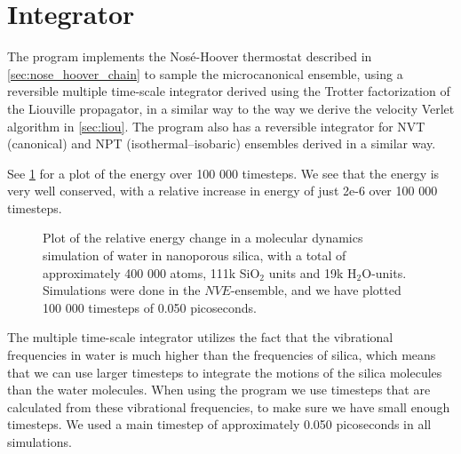 \section{Integrator\label{sec:sio2_integrator}}
%
The program implements the Nos\'e-Hoover thermostat described in \cref{sec:nose_hoover_chain} to sample the microcanonical ensemble, using a reversible multiple time-scale integrator derived using the Trotter factorization of the Liouville propagator\cite{tuckerman1992reversible}, in a similar way to the way we derive the velocity Verlet algorithm in \cref{sec:liou}. The program also has a reversible integrator for NVT (canonical) and NPT (isothermal–isobaric) ensembles\cite{martyna1996explicit} derived in a similar way. 

See \cref{fig:energy_conservation_plot} for a plot of the energy over 100 000 timesteps. We see that the energy is very well conserved, with a relative increase in energy of just 2e-6 over 100 000 timesteps.
%
\begin{figure}[!htb]%
    \centering%
    \caption{%
        Plot of the relative energy change in a molecular dynamics simulation of water in nanoporous silica, with a total of approximately 400 000 atoms, 111k SiO$_2$ units and 19k H$_2$O-units. Simulations were done in the $NVE$-ensemble, and we have plotted 100 000 timesteps of 0.050 picoseconds.%
        \label{fig:energy_conservation_plot}%
    }%
\end{figure}%

The multiple time-scale integrator utilizes the fact that the vibrational frequencies in water is much higher than the frequencies of silica, which means that we can use larger timesteps to integrate the motions of the silica molecules than the water molecules. When using the program we use timesteps that are calculated from these vibrational frequencies, to make sure we have small enough timesteps. We used a main timestep of approximately 0.050 picoseconds in all simulations.  %

